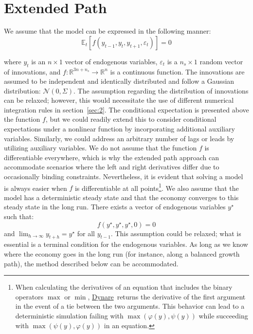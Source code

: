 \documentclass[a4paper,11pt]{amsart}
\newcommand{\Dynare}{\href{http://www.dynare.org}{Dynare}}
\begin{document}
\section{Extended Path}\label{sec:1}

We assume that the model can be expressed in the following manner:
\begin{equation}\label{eq:model}
   \mathbb E_t\left[f\left( y_{t-1}, y_t, y_{t+1}, \varepsilon_t \right)\right] = 0
\end{equation}

where \( y_t \) is an \( n \times 1 \) vector of endogenous
variables, \( \varepsilon_t \) is a \( n_s \times 1 \) random vector
of innovations,
and \( f: \mathbb R^{3n+n_s} \rightarrow \mathbb R^n \) is a
continuous function. The innovations are assumed to be independent and
identically distributed and follow a Gaussian
distribution: \( \mathcal N(0,\Sigma) \). The assumption regarding the
distribution of innovations can be relaxed; however, this would
necessitate the use of different numerical integration rules in
section~\ref{sec:2}. The conditional expectation is presented above
the function $f$, but we could readily extend this to consider
conditional expectations under a nonlinear function by incorporating
additional auxiliary variables. Similarly, we could address an
arbitrary number of lags or leads by utilizing auxiliary variables. We
do not assume that the function \(f\) is differentiable everywhere,
which is why the extended path approach can accommodate scenarios
where the left and right derivatives differ due to occasionally
binding constraints. Nevertheless, it is evident that solving a model
is always easier when \(f\) is differentiable at all
points\footnote{When calculating the derivatives of an equation that
   includes the binary operators $\max$ or $\min$, \Dynare\
   returns the derivative of the first argument in the event of a tie
   between the two arguments. This behavior can lead to a deterministic
   simulation failing with $\max\left(\varphi(y),\psi(y) \right)$ while
   succeeding with $\max\left(\psi(y),\varphi(y)\right)$ in an
   equation.}. We also assume that the model has a deterministic steady
state and that the economy converges to this steady state in the long
run. There exists a vector of endogenous variables \(y^{\star}\) such
that:
\[
   f\left(y^{\star},y^{\star},y^{\star}, 0\right) = 0
\]
and $\lim_{h\rightarrow\infty}y_{t+h} = y^{\star}$ for all $y_{t-1}$.
This assumption could be relaxed; what is essential is a terminal
condition for the endogenous variables. As long as we know where the
economy goes in the long run (for instance, along a balanced growth
path), the method described below can be accommodated.
\end{document}
